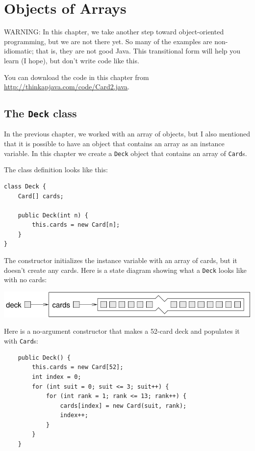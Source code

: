 \documentclass[12pt]{book}
\theoremstyle{exercise}
\begin{document}
\chapter{Objects of Arrays}
\label{chap12}

WARNING: In this chapter, we take another step toward object-oriented
programming, but we are not there yet.  So many of the examples are
non-idiomatic; that is, they are not good Java.  This transitional
form will help you learn (I hope), but don't write code like this.

You can download the code in this chapter from
\url{http://thinkapjava.com/code/Card2.java}.


\section{The {\tt Deck} class}
\label{deck}

In the previous chapter, we worked with an array of objects,
but I also mentioned that it is possible to have an object
that contains an array as an instance variable.  In this
chapter we create a {\tt Deck} object
that contains an array of {\tt Card}s.


The class definition looks like this:

\begin{lstlisting}
class Deck {
    Card[] cards;

    public Deck(int n) {
        this.cards = new Card[n];
    }
}
\end{lstlisting}
%
The constructor initializes the instance variable with
an array of cards, but it doesn't create any cards.
Here is a state diagram showing what a
{\tt Deck} looks like with no cards:


\includegraphics{figs/deckobject.pdf}

Here is a no-argument constructor that makes a
52-card deck and populates it with {\tt Card}s:

\begin{lstlisting}
    public Deck() {
        this.cards = new Card[52];
        int index = 0;
        for (int suit = 0; suit <= 3; suit++) {
            for (int rank = 1; rank <= 13; rank++) {
                cards[index] = new Card(suit, rank);
                index++;
            }
        }
    }
\end{lstlisting}
\end{document}
